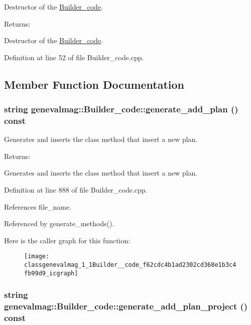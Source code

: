 Destructor of the \hyperlink{classgenevalmag_1_1Builder__code}{Builder\_\-code}. \begin{Desc}
\item[Returns:]\end{Desc}
Destructor of the \hyperlink{classgenevalmag_1_1Builder__code}{Builder\_\-code}. 

Definition at line 52 of file Builder\_\-code.cpp.

\subsection{Member Function Documentation}
\hypertarget{classgenevalmag_1_1Builder__code_f62cdc4b1ad2302cd368e1b3c4fb99d9}{
\subsubsection[{generate\_\-add\_\-plan}]{\setlength{\rightskip}{0pt plus 5cm}string genevalmag::Builder\_\-code::generate\_\-add\_\-plan () const}}
\label{classgenevalmag_1_1Builder__code_f62cdc4b1ad2302cd368e1b3c4fb99d9}


Generates and inserts the class method that insert a new plan. \begin{Desc}
\item[Returns:]\end{Desc}
Generates and inserts the class method that insert a new plan. 

Definition at line 888 of file Builder\_\-code.cpp.

References file\_\-name.

Referenced by generate\_\-methods().

Here is the caller graph for this function:\nopagebreak
\begin{figure}[H]
\begin{center}
\leavevmode
\texttt{[image: classgenevalmag\_1\_1Builder\_\_code\_f62cdc4b1ad2302cd368e1b3c4fb99d9\_icgraph]}
\end{center}
\end{figure}
\hypertarget{classgenevalmag_1_1Builder__code_16c49d69826f56e892f3580cdc7fa610}{
\subsubsection[{generate\_\-add\_\-plan\_\-project}]{\setlength{\rightskip}{0pt plus 5cm}string genevalmag::Builder\_\-code::generate\_\-add\_\-plan\_\-project () const}}
\label{classgenevalmag_1_1Builder__code_16c49d69826f56e892f3580cdc7fa610}


